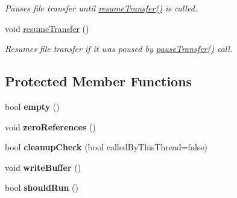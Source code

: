 \begin{DoxyCompactItemize}
\begin{DoxyCompactList}\small\item\em \-Pauses file transfer until \hyperlink{classfileWriter__t_abe0fb3ee157f227488ec70c4f6b716d2}{resume\-Transfer()} is called. \end{DoxyCompactList}\item 
\hypertarget{classfileWriter__t_abe0fb3ee157f227488ec70c4f6b716d2}{void \hyperlink{classfileWriter__t_abe0fb3ee157f227488ec70c4f6b716d2}{resume\-Transfer} ()}\label{classfileWriter__t_abe0fb3ee157f227488ec70c4f6b716d2}

\begin{DoxyCompactList}\small\item\em \-Resumes file transfer if it was paused by \hyperlink{classfileWriter__t_aa3e4622fd057a15cac60617dbfc1339e}{pause\-Transfer()} call. \end{DoxyCompactList}\end{DoxyCompactItemize}
\subsection*{\-Protected \-Member \-Functions}
\begin{DoxyCompactItemize}
\item 
\hypertarget{classfileWriter__t_a08c387ef25c99022c9660714b02dd859}{bool {\bfseries empty} ()}\label{classfileWriter__t_a08c387ef25c99022c9660714b02dd859}

\item 
\hypertarget{classfileWriter__t_a49badf76bef5bfee998b89ff77d48938}{void {\bfseries zero\-References} ()}\label{classfileWriter__t_a49badf76bef5bfee998b89ff77d48938}

\item 
\hypertarget{classfileWriter__t_ae0008df026e4d816aa48691f779fdef5}{bool {\bfseries cleanup\-Check} (bool called\-By\-This\-Thread=false)}\label{classfileWriter__t_ae0008df026e4d816aa48691f779fdef5}

\item 
\hypertarget{classfileWriter__t_a008087209a8f315475d08ed0c722d5bf}{void {\bfseries write\-Buffer} ()}\label{classfileWriter__t_a008087209a8f315475d08ed0c722d5bf}

\item 
\hypertarget{classfileWriter__t_a84a0fad8ab588424778f34fe89b1c039}{bool {\bfseries should\-Run} ()}\label{classfileWriter__t_a84a0fad8ab588424778f34fe89b1c039}

\end{DoxyCompactItemize}
